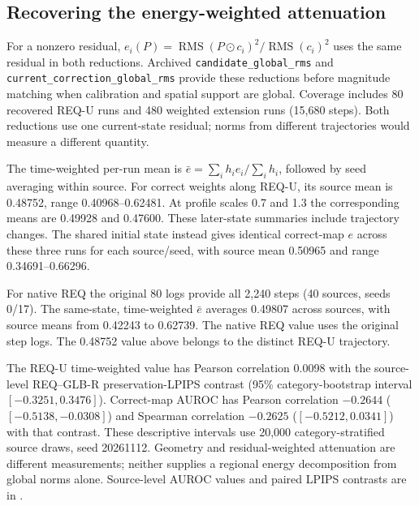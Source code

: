 \documentclass[10pt,doubleanonymous]{ieeeconf}
\newcommand{\RMS}{\operatorname{RMS}}
\begin{document}
\subsection{Recovering the energy-weighted attenuation}
For a nonzero residual, $e_i(P)=\RMS(P\odot c_i)^2/\RMS(c_i)^2$ uses the same residual in both reductions. Archived \texttt{candidate\_global\_rms} and \texttt{current\_correction\_global\_rms} provide these reductions before magnitude matching when calibration and spatial support are global. Coverage includes 80 recovered REQ-U runs and 480 weighted extension runs (15,680 steps). Both reductions use one current-state residual; norms from different trajectories would measure a different quantity.

The time-weighted per-run mean is $\bar e=\sum_i h_i e_i/\sum_i h_i$, followed by seed averaging within source. For correct weights along REQ-U, its source mean is 0.48752, range 0.40968--0.62481. At profile scales 0.7 and 1.3 the corresponding means are 0.49928 and 0.47600. These later-state summaries include trajectory changes. The shared initial state instead gives identical correct-map $e$ across these three runs for each source/seed, with source mean 0.50965 and range 0.34691--0.66296.

For native REQ the original 80 logs provide all 2,240 steps (40 sources, seeds 0/17). The same-state, time-weighted $\bar e$ averages 0.49807 across sources, with source means from 0.42243 to 0.62739. The native REQ value uses the original step logs. The 0.48752 value above belongs to the distinct REQ-U trajectory.

The REQ-U time-weighted value has Pearson correlation 0.0098 with the source-level REQ--GLB-R preservation-LPIPS contrast (95\% category-bootstrap interval $[-0.3251,0.3476]$). Correct-map AUROC has Pearson correlation $-0.2644$ ($[-0.5138,-0.0308]$) and Spearman correlation $-0.2625$ ($[-0.5212,0.0341]$) with that contrast. These descriptive intervals use 20,000 category-stratified source draws, seed 20261112. Geometry and residual-weighted attenuation are different measurements; neither supplies a regional energy decomposition from global norms alone. Source-level AUROC values and paired LPIPS contrasts are in .
\end{document}
